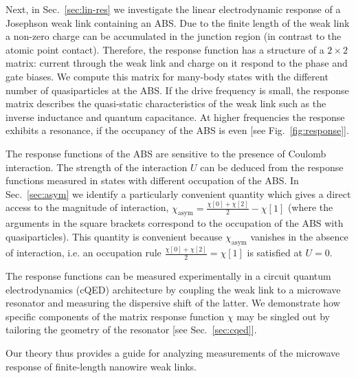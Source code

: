 \documentclass[aps,reprint,longbibliography, prb]{revtex4-2}
\begin{document}
Next, in Sec.~\ref{sec:lin-res} we investigate the linear electrodynamic response of a Josephson weak link containing an ABS.
Due to the finite length of the weak link a non-zero charge can be accumulated in the junction region (in contrast to the atomic point contact). 
Therefore, the response function has a structure of a $2 \times 2$ matrix: current through the weak link and charge on it respond to the phase and gate biases. We compute this matrix for many-body states with the different number of quasiparticles at the ABS. If the drive frequency is small, the response matrix describes the quasi-static characteristics of the weak link such as the inverse inductance and quantum capacitance. At higher frequencies the response exhibits a resonance, if the occupancy of the ABS is even [see Fig.~\ref{fig:response}].

The response functions of the ABS are sensitive to the presence of Coulomb interaction. The strength of the interaction $U$ can be deduced from the response functions measured in states with different occupation of the ABS. In Sec.~\ref{sec:asym} we identify a particularly convenient quantity which gives a direct access to the magnitude of interaction, $\chi_\mathrm{asym} = \frac{\chi[0]+\chi[2]}{2}-\chi[1]$ (where the arguments in the square brackets correspond to the occupation of the ABS with quasiparticles). This quantity is convenient because $\chi_\mathrm{asym}$ vanishes in the absence of interaction, i.e. an occupation rule $\frac{\chi[0]+\chi[2]}{2}=\chi[1]$ is satisfied at $U = 0$.

The response functions can be measured experimentally in a circuit quantum electrodynamics (cQED) architecture by coupling the weak link to a microwave resonator and measuring the dispersive shift of the latter. We demonstrate how specific components of the matrix response function $\chi$ may be singled out by tailoring the geometry of the resonator [see Sec.~\ref{sec:cqed}].

Our theory thus provides a guide for analyzing measurements of the microwave response of finite-length nanowire weak links. 
\end{document}
